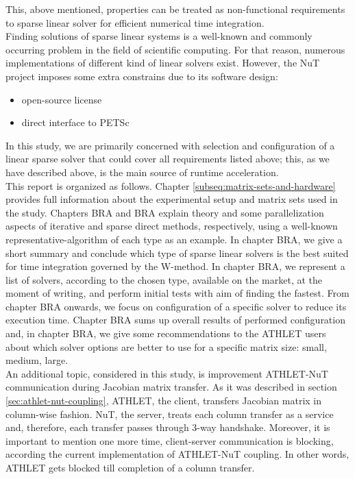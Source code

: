 This, above mentioned, properties can be treated as non-functional requirements to sparse linear solver for efficient numerical time integration.\\

 
Finding solutions of sparse linear systems is a well-known and commonly occurring problem in the field of scientific computing. For that reason, numerous implementations of different kind of linear solvers exist. However, the NuT project imposes some extra constrains due to its software design: \\


\begin{itemize}
	\item open-source license
	\item direct interface to PETSc
\end{itemize}



In this study, we are primarily concerned with selection and configuration of a linear sparse solver that could cover all requirements listed above; this, as we have described above, is the main source of runtime acceleration.\\


This report is organized as follows. Chapter \ref{subseq:matrix-sets-and-hardware} provides full information about the experimental setup and matrix sets  used in the study. Chapters BRA and BRA explain theory and some parallelization aspects of iterative and sparse direct methods, respectively, using a  well-known representative-algorithm of each type as an example. In chapter BRA, we give a short summary and conclude which type of sparse linear solvers is the best suited for time integration governed by the W-method. In chapter BRA, we represent a list of solvers, according to the chosen type, available on the market, at the moment of writing, and perform initial tests with aim of finding the fastest. From chapter BRA onwards, we focus on configuration of a specific solver to reduce its execution time. Chapter BRA sums up overall results of performed configuration and, in chapter BRA, we give some recommendations to the ATHLET users about which solver options are better to use for a specific matrix size: small, medium, large.\\


An additional topic, considered in this study, is improvement ATHLET-NuT communication during Jacobian matrix transfer. As it was described in section \ref{sec:athlet-nut-coupling}, ATHLET, the client, transfers Jacobian matrix in column-wise fashion. NuT, the server, treats each column transfer as a service and, therefore, each transfer passes through 3-way handshake. Moreover, it is important to mention one more time, client-server communication is blocking, according the current implementation of ATHLET-NuT coupling. In other words, ATHLET gets blocked till completion of a column transfer. \\


